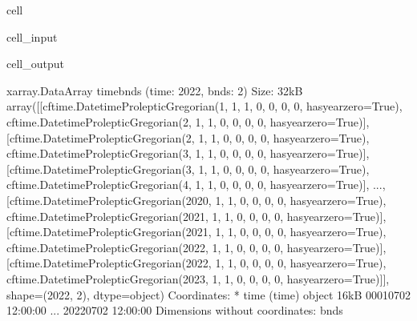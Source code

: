 \documentclass[letterpaper,10pt,english]{jupyterBook}
\begin{document}
\begin{sphinxuseclass}{cell}\begin{sphinxVerbatimInput}

\begin{sphinxuseclass}{cell_input}
\begin{sphinxVerbatim}[commandchars=\\\{\}]
\PYG{p}{[}\PYG{p}{]}
\end{sphinxVerbatim}

\end{sphinxuseclass}\end{sphinxVerbatimInput}
\begin{sphinxVerbatimOutput}

\begin{sphinxuseclass}{cell_output}
\begin{sphinxVerbatim}[commandchars=\\\{\}]
\PYGZlt{}xarray.DataArray \PYGZsq{}time\PYGZus{}bnds\PYGZsq{} (time: 2022, bnds: 2)\PYGZgt{} Size: 32kB
array([[cftime.DatetimeProlepticGregorian(1, 1, 1, 0, 0, 0, 0, has\PYGZus{}year\PYGZus{}zero=True),
        cftime.DatetimeProlepticGregorian(2, 1, 1, 0, 0, 0, 0, has\PYGZus{}year\PYGZus{}zero=True)],
       [cftime.DatetimeProlepticGregorian(2, 1, 1, 0, 0, 0, 0, has\PYGZus{}year\PYGZus{}zero=True),
        cftime.DatetimeProlepticGregorian(3, 1, 1, 0, 0, 0, 0, has\PYGZus{}year\PYGZus{}zero=True)],
       [cftime.DatetimeProlepticGregorian(3, 1, 1, 0, 0, 0, 0, has\PYGZus{}year\PYGZus{}zero=True),
        cftime.DatetimeProlepticGregorian(4, 1, 1, 0, 0, 0, 0, has\PYGZus{}year\PYGZus{}zero=True)],
       ...,
       [cftime.DatetimeProlepticGregorian(2020, 1, 1, 0, 0, 0, 0, has\PYGZus{}year\PYGZus{}zero=True),
        cftime.DatetimeProlepticGregorian(2021, 1, 1, 0, 0, 0, 0, has\PYGZus{}year\PYGZus{}zero=True)],
       [cftime.DatetimeProlepticGregorian(2021, 1, 1, 0, 0, 0, 0, has\PYGZus{}year\PYGZus{}zero=True),
        cftime.DatetimeProlepticGregorian(2022, 1, 1, 0, 0, 0, 0, has\PYGZus{}year\PYGZus{}zero=True)],
       [cftime.DatetimeProlepticGregorian(2022, 1, 1, 0, 0, 0, 0, has\PYGZus{}year\PYGZus{}zero=True),
        cftime.DatetimeProlepticGregorian(2023, 1, 1, 0, 0, 0, 0, has\PYGZus{}year\PYGZus{}zero=True)]],
      shape=(2022, 2), dtype=object)
Coordinates:
  * time     (time) object 16kB 0001\PYGZhy{}07\PYGZhy{}02 12:00:00 ... 2022\PYGZhy{}07\PYGZhy{}02 12:00:00
Dimensions without coordinates: bnds
\end{sphinxVerbatim}

\end{sphinxuseclass}\end{sphinxVerbatimOutput}

\end{sphinxuseclass}
\end{document}
